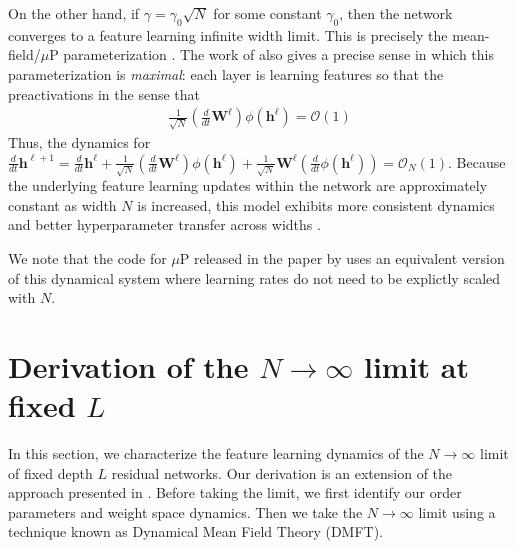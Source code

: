 \documentclass{article} %
\def\h{\bm h}
\def\W{\bm W}
\begin{document}
On the other hand, if $\gamma=\gamma_0 \sqrt{N}$ for some constant $\gamma_0$, then the network converges to a feature learning infinite width limit. This is precisely the mean-field/$\mu$P parameterization \citep{yang2021tensor, bordelon2022self, bordelon2022influence}. The work of \cite{yang2021tensor} also gives a precise sense in which this parameterization is \textit{maximal}: each layer is learning features so that the preactivations in the sense that
\begin{align}
    \frac{1}{\sqrt N} \left( \frac{d}{dt} \W^\ell \right) \phi(\h^\ell) = \mathcal{O}(1)
\end{align}
Thus, the dynamics for $\frac{d}{dt} \h^{\ell+1} = \frac{d}{dt} \h^\ell +  \frac{1}{\sqrt N} \left( \frac{d}{dt} \W^\ell \right) \phi(\h^\ell) + \frac{1}{\sqrt N} \W^\ell \left(\frac{d}{dt} \phi(\h^\ell) \right) = \mathcal O_N(1)$. Because the underlying feature learning updates within the network are approximately constant as width $N$ is increased, this model exhibits more consistent dynamics and better hyperparameter transfer across widths \citep{yang2022tensor, vyas2023featurelearning}. 

We note that the code for $\mu$P released in the paper by \cite{yang2022tensor} uses an equivalent version of this dynamical system where learning rates do not need to be explictly scaled with $N$. 

\section{Derivation of the $N \to \infty$ limit at fixed $L$}\label{app:dmft_derivation_finite_L}

In this section, we characterize the feature learning dynamics of the $N \to \infty$ limit of fixed depth $L$ residual networks. Our derivation is an extension of the approach presented in \citep{bordelon2022self}. Before taking the limit, we first identify our order parameters and weight space dynamics. Then we take the $N \to \infty$ limit using a technique known as Dynamical Mean Field Theory (DMFT). 
\end{document}
